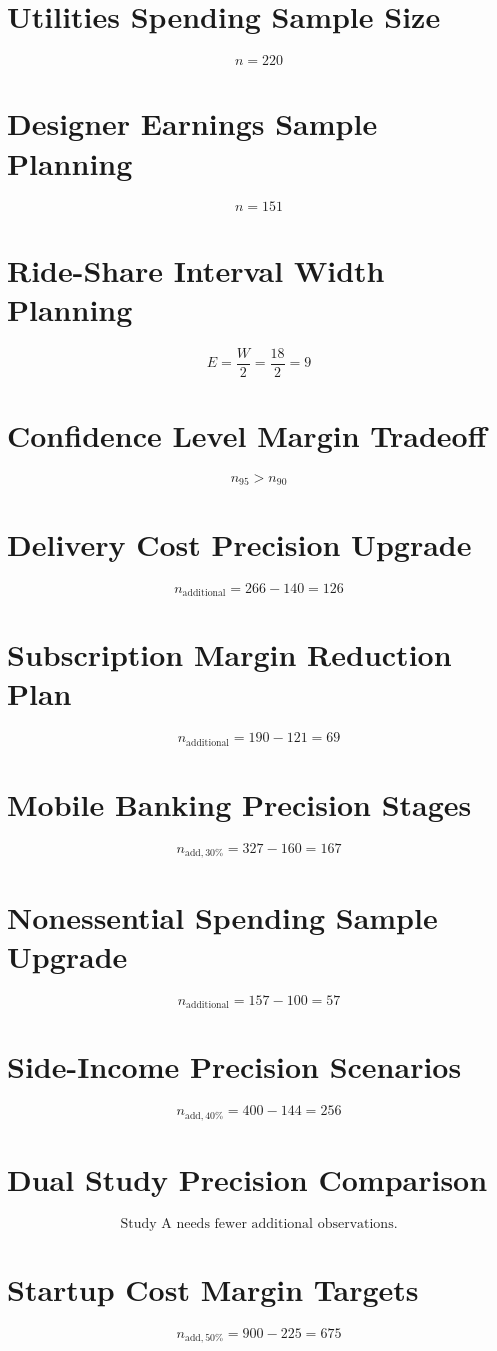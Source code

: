 \section*{Utilities Spending Sample Size}
\[n = 220\]

\section*{Designer Earnings Sample Planning}
\[n = 151\]

\section*{Ride-Share Interval Width Planning}
\[E = \frac{W}{2} = \frac{18}{2} = 9\]

\section*{Confidence Level Margin Tradeoff}
\[n_{95} > n_{90}\]

\section*{Delivery Cost Precision Upgrade}
\[n_{\text{additional}} = 266 - 140 = 126\]

\section*{Subscription Margin Reduction Plan}
\[n_{\text{additional}} = 190 - 121 = 69\]

\section*{Mobile Banking Precision Stages}
\[n_{\text{add},30\%} = 327 - 160 = 167\]

\section*{Nonessential Spending Sample Upgrade}
\[n_{\text{additional}} = 157 - 100 = 57\]

\section*{Side-Income Precision Scenarios}
\[n_{\text{add},40\%} = 400 - 144 = 256\]

\section*{Dual Study Precision Comparison}
\[\text{Study A needs fewer additional observations.}\]

\section*{Startup Cost Margin Targets}
\[n_{\text{add},50\%} = 900 - 225 = 675\]

